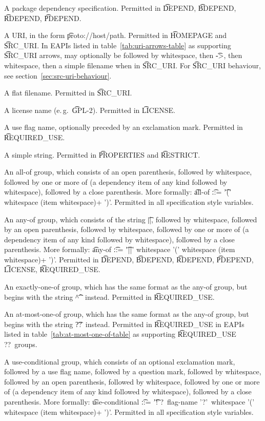 \begin{compactitem}
\item A package dependency specification. Permitted in \t{DEPEND}, \t{BDEPEND}, \t{RDEPEND},
    \t{PDEPEND}.
\item A URI, in the form \t{proto://host/path}. Permitted in \t{HOMEPAGE} and \t{SRC_URI}\@.
    In EAPIs listed in table~\ref{tab:uri-arrows-table} as supporting \t{SRC_URI} arrows, may
    optionally be followed by whitespace, then \t{->}, then whitespace, then a simple filename when
    in \t{SRC_URI}\@. For \t{SRC_URI} behaviour, see section~\ref{sec:src-uri-behaviour}.
\item A flat filename. Permitted in \t{SRC_URI}.
\item A license name (e.\,g.\ \t{GPL-2}). Permitted in \t{LICENSE}.
\item A use flag name, optionally preceded by an exclamation mark. Permitted in \t{REQUIRED_USE}.
\item A simple string. Permitted in \t{PROPERTIES} and \t{RESTRICT}.
\item An all-of group, which consists of an open parenthesis, followed by whitespace,
    followed by one or more of (a dependency item of any kind followed by whitespace), followed
    by a close parenthesis. More formally:
    \t{all-of} \t{::=} \t{'(' whitespace (item whitespace)+ ')'}. Permitted in all specification
    style variables.
\item An any-of group, which consists of the string \t{||}, followed by whitespace,
    followed by an open parenthesis, followed by whitespace, followed by one or more
    of (a dependency item of any kind followed by whitespace), followed by a close parenthesis.
    More formally: \t{any-of} \t{::=} \t{'||' whitespace '(' whitespace (item whitespace)+ ')'}.
    Permitted in \t{DEPEND}, \t{BDEPEND}, \t{RDEPEND}, \t{PDEPEND}, \t{LICENSE}, \t{REQUIRED_USE}.
\item An exactly-one-of group, which has the same format as the any-of group, but begins with the
    string \t{\textasciicircum\textasciicircum} instead. Permitted in \t{REQUIRED_USE}.
\item {} An at-most-one-of group, which has the same format as the
    any-of group, but begins with the string \t{??}\ instead. Permitted in \t{REQUIRED_USE} in
    EAPIs listed in table~\ref{tab:at-most-one-of-table} as supporting \t{REQUIRED_USE ??}\ groups.
\item A use-conditional group, which consists of an optional exclamation mark, followed by
    a use flag name, followed by a question mark, followed by whitespace, followed by
    an open parenthesis, followed by whitespace, followed by one or more of (a dependency item
    of any kind followed by whitespace), followed by a close parenthesis. More formally:
    \t{use-conditional} \t{::=} \t{'!'?\ flag-name '?'\ whitespace '(' whitespace (item
    whitespace)+ ')'}.
    Permitted in all specification style variables.
\end{compactitem}

